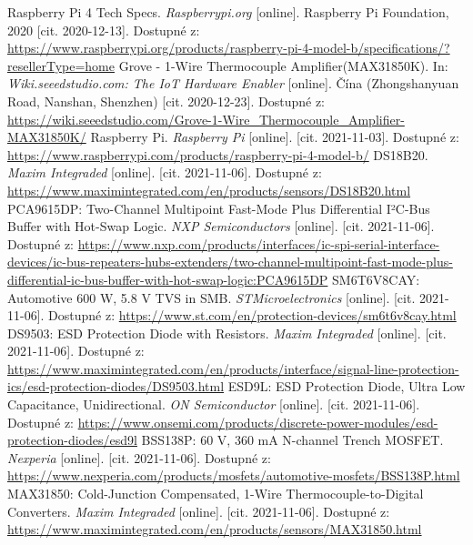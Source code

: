 \begin{thebibliography}{3}
Raspberry Pi 4 Tech Specs. \textit{Raspberrypi.org} [online]. Raspberry Pi Foundation, 2020 [cit. 2020-12-13]. Dostupné z: \url{https://www.raspberrypi.org/products/raspberry-pi-4-model-b/specifications/?resellerType=home}
Grove - 1-Wire Thermocouple Amplifier(MAX31850K). In: \textit{Wiki.seeedstudio.com: The IoT Hardware Enabler} [online]. Čína (Zhongshanyuan Road, Nanshan, Shenzhen) [cit. 2020-12-23]. Dostupné z: \url{https://wiki.seeedstudio.com/Grove-1-Wire\_Thermocouple\_Amplifier-MAX31850K/}
Raspberry Pi. \textit{Raspberry Pi} [online]. [cit. 2021-11-03]. Dostupné z: \url{https://www.raspberrypi.com/products/raspberry-pi-4-model-b/}
DS18B20. \textit{Maxim Integraded} [online]. [cit. 2021-11-06]. Dostupné z: \url{https://www.maximintegrated.com/en/products/sensors/DS18B20.html}
PCA9615DP: Two-Channel Multipoint Fast-Mode Plus Differential I²C-Bus Buffer with Hot-Swap Logic. \textit{NXP Semiconductors} [online]. [cit. 2021-11-06]. Dostupné z: \url{https://www.nxp.com/products/interfaces/ic-spi-serial-interface-devices/ic-bus-repeaters-hubs-extenders/two-channel-multipoint-fast-mode-plus-differential-ic-bus-buffer-with-hot-swap-logic:PCA9615DP}
SM6T6V8CAY: Automotive 600 W, 5.8 V TVS in SMB. \textit{STMicroelectronics} [online]. [cit. 2021-11-06]. Dostupné z: \url{https://www.st.com/en/protection-devices/sm6t6v8cay.html}
DS9503: ESD Protection Diode with Resistors. \textit{Maxim Integraded} [online]. [cit. 2021-11-06]. Dostupné z: \url{https://www.maximintegrated.com/en/products/interface/signal-line-protection-ics/esd-protection-diodes/DS9503.html}
ESD9L: ESD Protection Diode, Ultra Low Capacitance, Unidirectional. \textit{ON Semiconductor} [online]. [cit. 2021-11-06]. Dostupné z: \url{https://www.onsemi.com/products/discrete-power-modules/esd-protection-diodes/esd9l}
BSS138P: 60 V, 360 mA N-channel Trench MOSFET. \textit{Nexperia} [online]. [cit. 2021-11-06]. Dostupné z: \url{https://www.nexperia.com/products/mosfets/automotive-mosfets/BSS138P.html}
MAX31850: Cold-Junction Compensated, 1-Wire Thermocouple-to-Digital Converters. \textit{Maxim Integraded} [online]. [cit. 2021-11-06]. Dostupné z: \url{https://www.maximintegrated.com/en/products/sensors/MAX31850.html}

\end{thebibliography}
